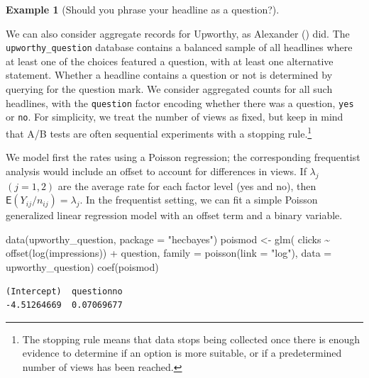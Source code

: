 \documentclass[
  11pt,
  letterpaper,
]{scrbook}
\newenvironment{Shaded}{\begin{snugshade}}{\end{snugshade}}
\newcommand{\AttributeTok}[1]{\textcolor[rgb]{0.40,0.45,0.13}{#1}}
\newcommand{\FunctionTok}[1]{\textcolor[rgb]{0.28,0.35,0.67}{#1}}
\newcommand{\NormalTok}[1]{\textcolor[rgb]{0.00,0.23,0.31}{#1}}
\newcommand{\OtherTok}[1]{\textcolor[rgb]{0.00,0.23,0.31}{#1}}
\newcommand{\SpecialCharTok}[1]{\textcolor[rgb]{0.37,0.37,0.37}{#1}}
\newcommand{\StringTok}[1]{\textcolor[rgb]{0.13,0.47,0.30}{#1}}
\theoremstyle{definition}
\theoremstyle{definition}
\newtheorem{example}{Example}[chapter]
\theoremstyle{definition}
\theoremstyle{plain}
\theoremstyle{plain}
\theoremstyle{remark}
\begin{document}
\begin{example}[Should you phrase your headline as a
question?]\protect\hypertarget{exm-poisson-upworthy-question}{}\label{exm-poisson-upworthy-question}

We can also consider aggregate records for Upworthy, as Alexander
() did. The
\texttt{upworthy\_question} database contains a balanced sample of all
headlines where at least one of the choices featured a question, with at
least one alternative statement. Whether a headline contains a question
or not is determined by querying for the question mark. We consider
aggregated counts for all such headlines, with the \texttt{question}
factor encoding whether there was a question, \texttt{yes} or
\texttt{no}. For simplicity, we treat the number of views as fixed, but
keep in mind that A/B tests are often sequential experiments with a
stopping rule.\footnote{The stopping rule means that data stops being
  collected once there is enough evidence to determine if an option is
  more suitable, or if a predetermined number of views has been reached.}

We model first the rates using a Poisson regression; the corresponding
frequentist analysis would include an offset to account for differences
in views. If \(\lambda_{j}\) \((j=1, 2)\) are the average rate for each
factor level (yes and no), then
\(\mathsf{E}(Y_{ij}/n_{ij}) = \lambda_j\). In the frequentist setting,
we can fit a simple Poisson generalized linear regression model with an
offset term and a binary variable.

\begin{Shaded}
\begin{Highlighting}[]
\FunctionTok{data}\NormalTok{(upworthy\_question, }\AttributeTok{package =} \StringTok{"hecbayes"}\NormalTok{)}
\NormalTok{poismod }\OtherTok{\textless{}{-}} \FunctionTok{glm}\NormalTok{(}
\NormalTok{  clicks }\SpecialCharTok{\textasciitilde{}} \FunctionTok{offset}\NormalTok{(}\FunctionTok{log}\NormalTok{(impressions)) }\SpecialCharTok{+}\NormalTok{ question, }
  \AttributeTok{family =} \FunctionTok{poisson}\NormalTok{(}\AttributeTok{link =} \StringTok{"log"}\NormalTok{),}
  \AttributeTok{data =}\NormalTok{ upworthy\_question)}
\FunctionTok{coef}\NormalTok{(poismod)}
\end{Highlighting}
\end{Shaded}

\begin{verbatim}
(Intercept)  questionno 
-4.51264669  0.07069677 
\end{verbatim}


\end{example}
\end{document}
